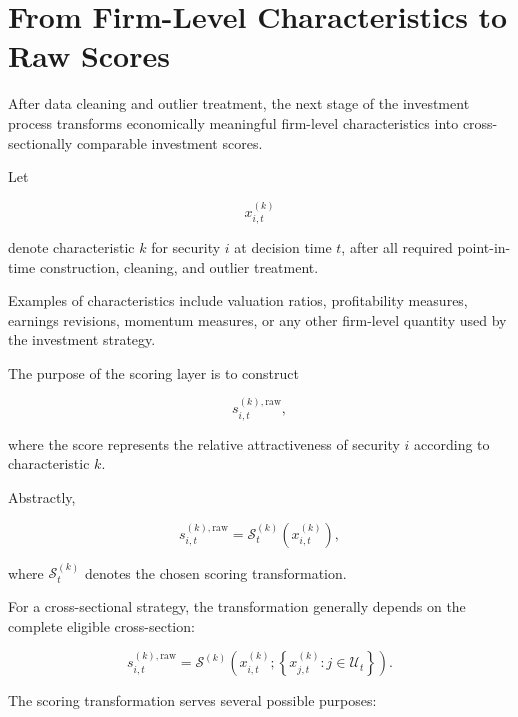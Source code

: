 \documentclass[11pt,a4paper]{article}
\begin{document}
\section{From Firm-Level Characteristics to Raw Scores}
\label{sec:characteristics_to_raw_scores}

After data cleaning and outlier treatment, the next stage of the investment
process transforms economically meaningful firm-level characteristics into
cross-sectionally comparable investment scores.

Let

\begin{equation}
x_{i,t}^{(k)}
\end{equation}

denote characteristic $k$ for security $i$ at decision time $t$, after all
required point-in-time construction, cleaning, and outlier treatment.

Examples of characteristics include valuation ratios, profitability measures,
earnings revisions, momentum measures, or any other firm-level quantity used by
the investment strategy.

The purpose of the scoring layer is to construct

\begin{equation}
s_{i,t}^{(k),\mathrm{raw}},
\end{equation}

where the score represents the relative attractiveness of security $i$
according to characteristic $k$.

Abstractly,

\begin{equation}
\boxed{
s_{i,t}^{(k),\mathrm{raw}}
=
\mathcal{S}_t^{(k)}
\left(
x_{i,t}^{(k)}
\right),
}
\end{equation}

where $\mathcal{S}_t^{(k)}$ denotes the chosen scoring transformation.

For a cross-sectional strategy, the transformation generally depends on the
complete eligible cross-section:

\begin{equation}
\boxed{
s_{i,t}^{(k),\mathrm{raw}}
=
\mathcal{S}^{(k)}
\left(
x_{i,t}^{(k)};
\left\{
x_{j,t}^{(k)}
:
j\in\mathcal{U}_t
\right\}
\right).
}
\end{equation}

The scoring transformation serves several possible purposes:
\end{document}
